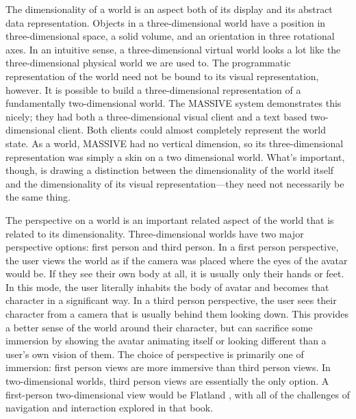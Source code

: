 The dimensionality of a world is an aspect both of its display and its abstract data representation. Objects in a three-dimensional world have a position in three-dimensional space, a solid volume, and an orientation in three rotational axes. In an intuitive sense, a three-dimensional virtual world looks a lot like the three-dimensional physical world we are used to. The programmatic representation of the world need not be bound to its visual representation, however. It is possible to build a three-dimensional representation of a fundamentally two-dimensional world. The MASSIVE system demonstrates this nicely; they had both a three-dimensional visual client and a text based two-dimensional client. Both clients could almost completely represent the world state. As a world, MASSIVE had no vertical dimension, so its three-dimensional representation was simply a skin on a two dimensional world. \citep{Greenhalgh:1995gz} What's important, though, is drawing a distinction between the dimensionality of the world itself and the dimensionality of its visual representation---they need not necessarily be the same thing.

The perspective on a world is an important related aspect of the world that is related to its dimensionality. Three-dimensional worlds have two major perspective options: first person and third person. In a first person perspective, the user views the world as if the camera was placed where the eyes of the avatar would be. If they see their own body at all, it is usually only their hands or feet. In this mode, the user literally inhabits the body of avatar and becomes that character in a significant way. In a third person perspective, the user sees their character from a camera that is usually behind them looking down. This provides a better sense of the world around their character, but can sacrifice some immersion by showing the avatar animating itself or looking different than a user's own vision of them. The choice of perspective is primarily one of immersion: first person views are more immersive than third person views. In two-dimensional worlds, third person views are essentially the only option. A first-person two-dimensional view would be Flatland \citep{Abbot:1899th}, with all of the challenges of navigation and interaction explored in that book.

